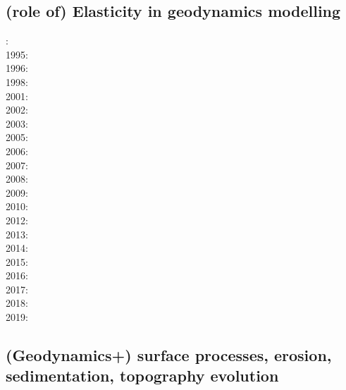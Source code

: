 \cite{haha05}
\cite{erhh13}

\subsection{(role of) Elasticity in geodynamics modelling}

{\scriptsize
{}:\cite{yusa84}\\
1995:\cite{budi95}\\
1996:\cite{hach96}\\
1998:\cite{copo98}\\
2001:\cite{vapy01}\\
2002:\cite{mumh02}\cite{modm02}\\
2003:\cite{hukm03}\cite{wabu03}\\
2005:\cite{mure05}\\
2006:\cite{kapo06}\cite{mudm06}\\
2007:\cite{kabe07}\\
2008:\cite{baso08}\cite{fukk08}\\
2009:\cite{qurj09}\\
2010:\cite{bepo10}\\
2012:\cite{gerb12}\cite{kasc12}\\
2013:\cite{wahd13}\\
2014:\cite{famc14}\cite{fogm14}\cite{olbe14}\cite{hepk14}\\
2015:\cite{thkp15}\\
2016:\cite{bafl16}\cite{jads16}\cite{olbm16}\cite{bafl16}\\
2017:\cite{pact17}\\
2018:\cite{dusd18}\\
2019:\cite{pact19}
}

\subsection{(Geodynamics+) surface processes, erosion, sedimentation, topography evolution}

